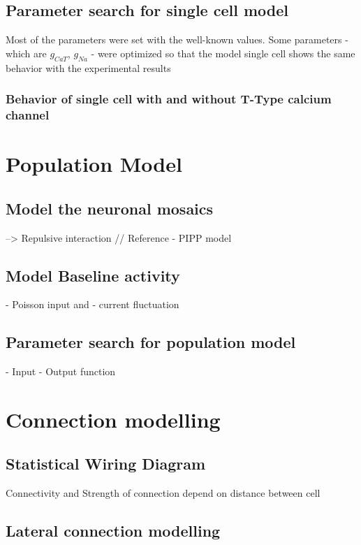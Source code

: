 \subsection{Parameter search for single cell model}
Most of the parameters were set with the well-known values. Some parameters - which are 
$g_{CaT}$, $g_{Na}$ - were optimized so that the model single cell shows the same behavior with the experimental results

\subsubsection{Behavior of single cell with and without T-Type calcium channel}


\section{Population Model}
\subsection{Model the neuronal mosaics}
 --> Repulsive interaction  // Reference - PIPP model 
 \subsection{Model Baseline activity}
 - Poisson input 
 and 
 - current fluctuation 
 \subsection{Parameter search for population model}
 -  Input - Output function

\section{Connection modelling }

\subsection{Statistical Wiring Diagram}
Connectivity and  Strength of connection depend on distance between cell\cite{ringach2004haphazard,mclaughlin2000neuronal}
\cite{mclaughlin2000neuronal}

\subsection{Lateral connection modelling}


